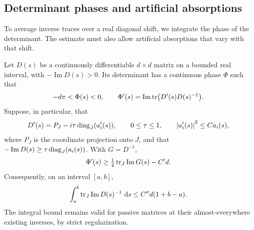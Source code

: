 \subsection{Determinant phases and artificial absorptions}

To average inverse traces over a real diagonal shift, we integrate the
phase of the determinant. The estimate must also allow artificial
absorptions that vary with that shift.

\begin{lemma}\label{mat:phase}
Let $D(s)$ be a continuously differentiable $d\times d$ matrix on a
bounded real interval, with $-\operatorname{Im}D(s)>0$. Its determinant
has a continuous phase $\Phi$ such that
\begin{equation}
 -d\pi<\Phi(s)<0,\qquad
 \Phi'(s)=\operatorname{Im}\operatorname{tr}\bigl(D'(s)D(s)^{-1}\bigr).
 \label{mat:phase-derivative}
\end{equation}
Suppose, in particular, that
\[
 D'(s)=P_J-i\tau\operatorname{diag}_J(a_i'(s)),\qquad
 0\le\tau\le1,\qquad \left\lvert a_i'(s)\right\rvert^2\le C a_i(s),
\]
where $P_J$ is the coordinate projection onto $J$, and that
$-\operatorname{Im}D(s)\ge\tau\operatorname{diag}_J(a_i(s))$. With $G=D^{-1}$,
\begin{equation}
 \Phi'(s)\ge\tfrac12\operatorname{tr}_J\operatorname{Im}G(s)-C'd.
 \label{mat:phase-lower}
\end{equation}
Consequently, on an interval $[a,b]$,
\begin{equation}
 \int_a^b\operatorname{tr}_J\operatorname{Im}D(s)^{-1}\,\,\mathrm d s
                  \le C''d(1+b-a).
 \label{mat:phase-integral}
\end{equation}
The integral bound remains valid for passive matrices at their
almost-everywhere existing inverses, by strict regularization.
\end{lemma}

